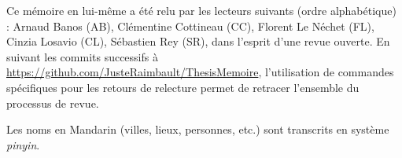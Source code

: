 Ce mémoire en lui-même a été relu par les lecteurs suivants (ordre alphabétique) : Arnaud Banos (AB), Clémentine Cottineau (CC), Florent Le Néchet (FL), Cinzia Losavio (CL), Sébastien Rey (SR), dans l'esprit d'une revue ouverte. En suivant les commits successifs à \url{https://github.com/JusteRaimbault/ThesisMemoire}, l'utilisation de commandes spécifiques pour les retours de relecture permet de retracer l'ensemble du processus de revue.

Les noms en Mandarin (villes, lieux, personnes, etc.) sont transcrits en système \emph{pinyin}.




\endgroup			

\vfill










